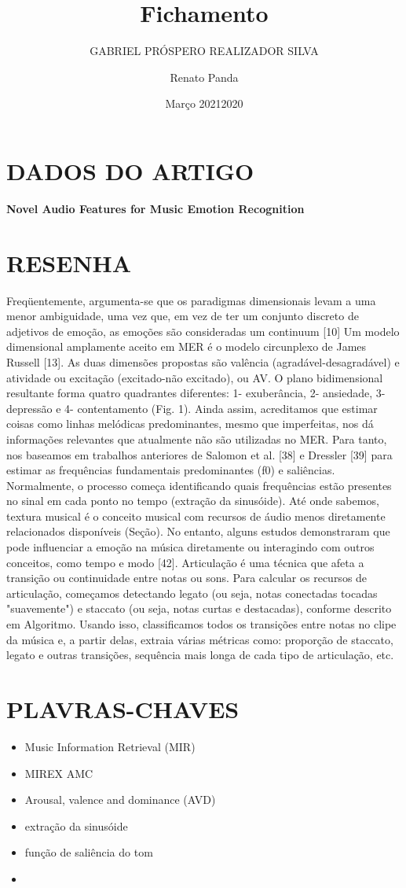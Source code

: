 \documentclass{article}
\title{Fichamento}
\author{GABRIEL PRÓSPERO REALIZADOR  SILVA}
\date{Março 2021}
\begin{document}
\maketitle

\section{DADOS DO ARTIGO}
\textbf{Novel Audio Features for Music Emotion Recognition \\}
\author{Renato Panda \\}
\date{2020}

\section{RESENHA}
Freqüentemente, argumenta-se que os paradigmas dimensionais levam a uma menor ambiguidade, uma vez que, em vez de ter um conjunto discreto de adjetivos de emoção, as emoções são consideradas um continuum [10] Um modelo dimensional amplamente aceito em MER é o modelo circunplexo de James Russell [13].
As duas dimensões propostas são valência (agradável-desagradável) e atividade ou excitação (excitado-não excitado), ou AV. O plano bidimensional resultante forma quatro quadrantes diferentes: 1- exuberância, 2- ansiedade, 3- depressão e 4- contentamento (Fig. 1).
Ainda assim, acreditamos que estimar coisas como linhas melódicas predominantes, mesmo que imperfeitas, nos dá informações relevantes que atualmente não são utilizadas no MER. Para tanto, nos baseamos em trabalhos anteriores de Salomon et al. [38] e Dressler [39] para estimar as frequências fundamentais predominantes (f0) e saliências. Normalmente, o processo começa identificando quais frequências estão presentes no sinal em cada ponto no tempo (extração da sinusóide).
Até onde sabemos, textura musical é o conceito musical com recursos de áudio menos diretamente relacionados disponíveis (Seção). No entanto, alguns estudos demonstraram que pode influenciar a emoção na música diretamente ou interagindo com outros conceitos, como tempo e modo [42]. 
Articulação é uma técnica que afeta a transição ou continuidade entre notas ou sons. Para calcular os recursos de articulação, começamos detectando legato (ou seja, notas conectadas tocadas "suavemente") e staccato (ou seja, notas curtas e destacadas), conforme descrito em Algoritmo. Usando isso, classificamos todos os
transições entre notas no clipe da música e, a partir delas, extraia várias métricas como: proporção de staccato, legato e outras transições, sequência mais longa de cada tipo de articulação, etc.


\section{PLAVRAS-CHAVES}
\begin{itemize}
    \item Music Information Retrieval (MIR)
    \item MIREX AMC
    \item Arousal, valence and dominance (AVD)
    \item extração da sinusóide
    \item função de saliência do tom
    \item 
\end{itemize}
\end{document}
